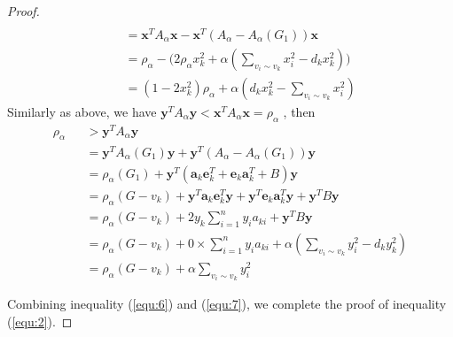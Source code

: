 \documentclass[amsthm]{elsart}
\begin{document}
\begin{proof}
\begin{eqnarray}
\\ \nonumber &&= \textbf{x}^T A_\alpha \textbf{x} - \textbf{x}^T(A_\alpha - A_\alpha(G_1))\textbf{x}
\\ \nonumber &&= \rho_\alpha - \Big( 2 \rho_\alpha x_k^2 + \alpha (\sum \limits_{v_i \sim v_k}^{} x_i^2 - d_k x_k^2 )\Big)
\\  \label{equ:6} &&= ( 1 -2 x_k^2)\rho_\alpha + \alpha (d_k x_k^2 - \sum \limits_{v_i \sim v_k}^{} x_i^2 )
\end{eqnarray}
Similarly as above, we have $\textbf{y}^{T} A_\alpha \textbf{y}  < \textbf{x}^{T} A_\alpha \textbf{x} = \rho_\alpha $ , then
\begin{eqnarray}
\nonumber  \rho_\alpha
&&> \textbf{y} ^T A_\alpha \textbf{y}
\\ \nonumber &&= \textbf{y} ^T A_\alpha(G_1) \textbf{y} + \textbf{y}^T (A_\alpha - A_\alpha(G_1)) \textbf{y}
\\ \nonumber &&= \rho_\alpha(G_1) + \textbf{y}^T (\textbf{a}_k \textbf{e}_k^T + \textbf{e}_k \textbf{a}_k^T + B) \textbf{y}
\\ \nonumber &&= \rho_\alpha(G - v_k) + \textbf{y}^T \textbf{a}_k \textbf{e}_k^T \textbf{y} + \textbf{y}^T \textbf{e}_k \textbf{a}_k^T \textbf{y} + \textbf{y}^T B \textbf{y}
\\ \nonumber &&= \rho_\alpha(G - v_k)
  + 2y_k \sum \limits_{i=1}^{n}y_i a_{ki}
  + \textbf{y}^T B \textbf{y}
\\ \nonumber &&= \rho_\alpha(G - v_k)
  + 0 \times \sum \limits_{i=1}^{n}y_i a_{ki}
  + \alpha  (\sum \limits_{v_i \sim v_k}^{} y_i^2 - d_k y_k^2 )
\\ \label{equ:7}  &&= \rho_\alpha(G - v_k) + \alpha \sum \limits_{v_i \sim v_k}^{} y_i^2
\end{eqnarray}

Combining inequality (\ref{equ:6}) and (\ref{equ:7}), we complete the proof of inequality (\ref{equ:2}).


\end{proof}
\end{document}
